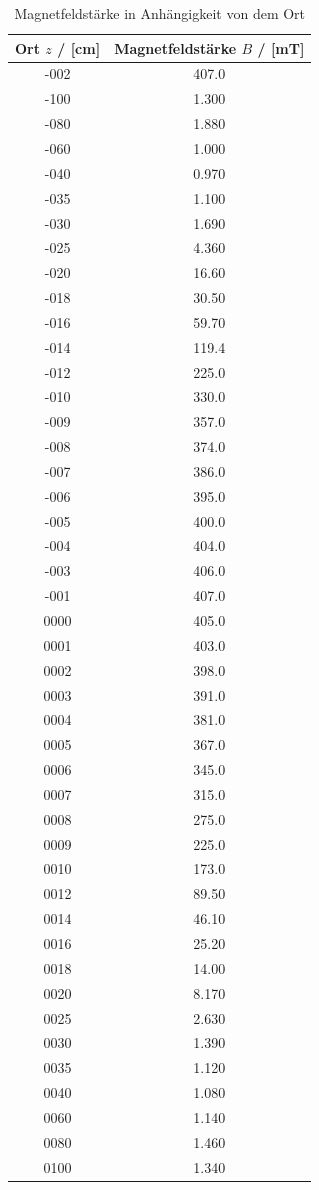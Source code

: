 \begin{table}
  \centering
  \begin{tabular}{cc}
    \toprule
    Ort $z$ / [cm] & Magnetfeldstärke $B$ / [mT] \\
    \midrule
    -002 & 407.0 \\
    -100 & 1.300 \\
    -080 & 1.880 \\
    -060 & 1.000 \\
    -040 & 0.970 \\
    -035 & 1.100 \\
    -030 & 1.690 \\
    -025 & 4.360 \\
    -020 & 16.60 \\
    -018 & 30.50 \\
    -016 & 59.70 \\
    -014 & 119.4 \\
    -012 & 225.0 \\
    -010 & 330.0 \\
    -009 & 357.0 \\
    -008 & 374.0 \\
    -007 & 386.0 \\
    -006 & 395.0 \\
    -005 & 400.0 \\
    -004 & 404.0 \\
    -003 & 406.0 \\
    -001 & 407.0 \\
    0000 & 405.0 \\
    0001 & 403.0 \\
    0002 & 398.0 \\
    0003 & 391.0 \\
    0004 & 381.0 \\
    0005 & 367.0 \\
    0006 & 345.0 \\
    0007 & 315.0 \\
    0008 & 275.0 \\
    0009 & 225.0 \\
    0010 & 173.0 \\
    0012 & 89.50 \\
    0014 & 46.10 \\
    0016 & 25.20 \\
    0018 & 14.00 \\
    0020 & 8.170 \\
    0025 & 2.630 \\
    0030 & 1.390 \\
    0035 & 1.120 \\
    0040 & 1.080 \\
    0060 & 1.140 \\
    0080 & 1.460 \\
    0100 & 1.340 \\
    \bottomrule
  \end{tabular}
  \caption{Magnetfeldstärke in Anhängigkeit von dem Ort}
  \label{tab:B(z)}
\end{table}

